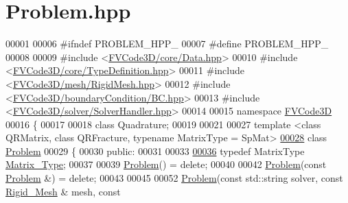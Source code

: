 \hypertarget{Problem_8hpp_source}{}\section{Problem.\+hpp}
\label{Problem_8hpp_source}

\begin{DoxyCode}
00001 
00006 \textcolor{preprocessor}{#ifndef PROBLEM\_HPP\_}
00007 \textcolor{preprocessor}{#define PROBLEM\_HPP\_}
00008 
00009 \textcolor{preprocessor}{#include <\hyperlink{Data_8hpp}{FVCode3D/core/Data.hpp}>}
00010 \textcolor{preprocessor}{#include <\hyperlink{TypeDefinition_8hpp}{FVCode3D/core/TypeDefinition.hpp}>}
00011 \textcolor{preprocessor}{#include <\hyperlink{RigidMesh_8hpp}{FVCode3D/mesh/RigidMesh.hpp}>}
00012 \textcolor{preprocessor}{#include <\hyperlink{BC_8hpp}{FVCode3D/boundaryCondition/BC.hpp}>}
00013 \textcolor{preprocessor}{#include <\hyperlink{SolverHandler_8hpp}{FVCode3D/solver/SolverHandler.hpp}>}
00014 
00015 \textcolor{keyword}{namespace }\hyperlink{namespaceFVCode3D}{FVCode3D}
00016 \{
00017 
00018 \textcolor{keyword}{class }Quadrature;
00019 
00021 
00027 \textcolor{keyword}{template} <\textcolor{keyword}{class} QRMatrix, \textcolor{keyword}{class} QRFracture, \textcolor{keyword}{typename} MatrixType = SpMat>
\hypertarget{Problem_8hpp_source.tex_l00028}{}\hyperlink{classFVCode3D_1_1Problem}{00028} \textcolor{keyword}{class }\hyperlink{classFVCode3D_1_1Problem}{Problem}
00029 \{
00030 \textcolor{keyword}{public}:
00031 
00033 
\hypertarget{Problem_8hpp_source.tex_l00036}{}\hyperlink{classFVCode3D_1_1Problem_a91f0670813837256bdc1c149fdcc1fd5}{00036}     \textcolor{keyword}{typedef} MatrixType \hyperlink{classFVCode3D_1_1Problem_a91f0670813837256bdc1c149fdcc1fd5}{Matrix\_Type};
00037 
00039     \hyperlink{classFVCode3D_1_1Problem_a80413b277179c79d94f674440c961a90}{Problem}() = \textcolor{keyword}{delete};
00040 
00042     \hyperlink{classFVCode3D_1_1Problem_a80413b277179c79d94f674440c961a90}{Problem}(\textcolor{keyword}{const} \hyperlink{classFVCode3D_1_1Problem}{Problem} &) = \textcolor{keyword}{delete};
00043 
00045 
00052     \hyperlink{classFVCode3D_1_1Problem_a80413b277179c79d94f674440c961a90}{Problem}(\textcolor{keyword}{const} std::string solver, \textcolor{keyword}{const} \hyperlink{classFVCode3D_1_1Rigid__Mesh}{Rigid\_Mesh} & mesh, \textcolor{keyword}{const} 

\end{DoxyCode}
